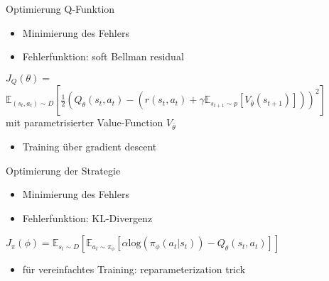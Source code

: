 \begin{frame}{Optimierung Q-Funktion}
\begin{itemize}
\item Minimierung des Fehlers
\item Fehlerfunktion: soft Bellman residual \\[12pt]
\end{itemize}
 $J_{Q}(\theta)=$
$\mathbb{E}_{(s_{t},a_{t})\sim D}\left[\frac{1}{2}(Q_{\theta}(s_{t},a_{t})-(r(s_{t},a_{t})+\gamma \mathbb{E}_{s_{t+1}\sim p}[V_{\overline{\theta}}(s_{t+1})]))^{2}\right]$ \\[12pt]

mit parametrisierter Value-Function $V_{\overline{\theta}}$ \\[12pt]

\begin{itemize}
\item Training über gradient descent
\end{itemize}
\end{frame}

\begin{frame}{Optimierung der Strategie}
\begin{itemize}
\item Minimierung des Fehlers
\item Fehlerfunktion: KL-Divergenz \\[12pt]
\end{itemize}
$J_{\pi}(\phi)=\mathbb{E}_{s_{t}\sim D}\left[\mathbb{E}_{a_{t}\sim \pi_{\phi}}\left[\alpha \mathrm{log}(\pi_{\phi}(a_{t}|s_{t}))-Q_{\theta}(s_{t},a_{t})\right]\right]$ \\[12pt]
\begin{itemize}
\item für vereinfachtes Training: reparameterization trick
\end{itemize}
\end{frame}

